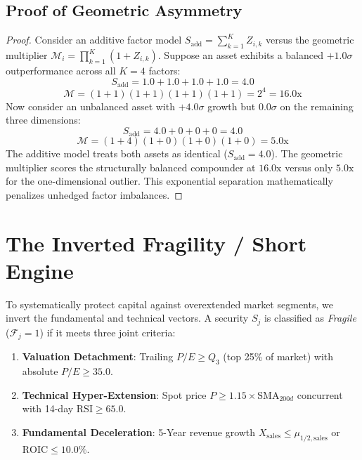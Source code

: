 \documentclass[11pt]{article}
\begin{document}
\subsection{Proof of Geometric Asymmetry}
\begin{proof}
Consider an additive factor model $S_{\text{add}} = \sum_{k=1}^K Z_{i,k}$ versus the geometric multiplier $\mathcal{M}_i = \prod_{k=1}^K (1 + Z_{i,k})$. Suppose an asset exhibits a balanced $+1.0\sigma$ outperformance across all $K=4$ factors:
\begin{equation}
    S_{\text{add}} = 1.0 + 1.0 + 1.0 + 1.0 = 4.0
\end{equation}
\begin{equation}
    \mathcal{M} = (1 + 1)(1 + 1)(1 + 1)(1 + 1) = 2^4 = 16.0\text{x}
\end{equation}
Now consider an unbalanced asset with $+4.0\sigma$ growth but $0.0\sigma$ on the remaining three dimensions:
\begin{equation}
    S_{\text{add}} = 4.0 + 0 + 0 + 0 = 4.0
\end{equation}
\begin{equation}
    \mathcal{M} = (1 + 4)(1 + 0)(1 + 0)(1 + 0) = 5.0\text{x}
\end{equation}
The additive model treats both assets as identical ($S_{\text{add}} = 4.0$). The geometric multiplier scores the structurally balanced compounder at $16.0\text{x}$ versus only $5.0\text{x}$ for the one-dimensional outlier. This exponential separation mathematically penalizes unhedged factor imbalances.
\end{proof}

\section{The Inverted Fragility / Short Engine}

To systematically protect capital against overextended market segments, we invert the fundamental and technical vectors. A security $S_j$ is classified as \textit{Fragile} ($\mathcal{F}_j = 1$) if it meets three joint criteria:
\begin{enumerate}
    \item \textbf{Valuation Detachment}: Trailing $P/E \ge Q_3$ (top 25\% of market) with absolute $P/E \ge 35.0$.
    \item \textbf{Technical Hyper-Extension}: Spot price $P \ge 1.15 \times \text{SMA}_{200d}$ concurrent with 14-day $\text{RSI} \ge 65.0$.
    \item \textbf{Fundamental Deceleration}: 5-Year revenue growth $X_{\text{sales}} \le \mu_{1/2, \text{sales}}$ or $\text{ROIC} \le 10.0\%$.
\end{enumerate}
\end{document}

